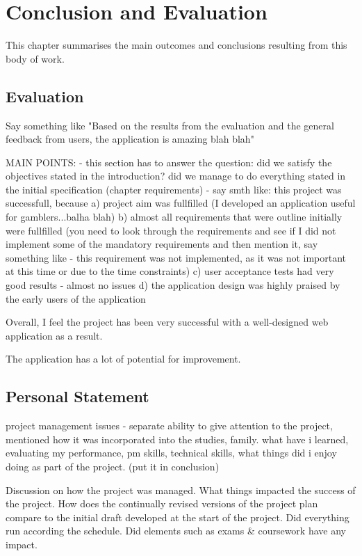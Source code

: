 \chapter{Conclusion and Evaluation}
\label{ch:ConclusionEvaluation}
This chapter summarises the main outcomes and conclusions resulting from this body of work.

\section{Evaluation}
\label{sec:evaluation_conclusion}
Say something like "Based on the results from the evaluation and the general feedback from users, the application is amazing blah blah"

MAIN POINTS:
- this section has to answer the question: did we satisfy the objectives stated in the introduction? did we manage to do everything stated 
in the initial specification (chapter requirements)
- say smth like: this project was successfull, because
a) project aim was fullfilled (I developed an application useful for gamblers...balha blah)
b) almost all requirements that were outline initially were fullfilled (you need to look through the requirements and see if I did not implement some of the mandatory requirements and then mention it, say something like - this requirement was not implemented, as it was not important at this time or due to the time constraints)
c)  user acceptance tests had very good results - almost no issues
d) the application design was highly praised by the early users of the application

Overall, I feel the project has been very successful with a well-designed web application as a result.

The application has a lot of potential for improvement.

\section{Personal Statement}
\label{sec:personalstatement_conclusion}
project management issues - separate ability to give attention to the project, mentioned how it was incorporated into the studies, family. what have i learned, evaluating my performance, pm skills, technical skills, what things did i enjoy doing as part of the project. (put it in conclusion)

Discussion on how the project was managed. What things impacted the success of the project. How does the continually revised versions of the project plan compare to the initial draft developed at the start of the project. Did everything run according the schedule. Did elements such as exams \& coursework have any impact. 

